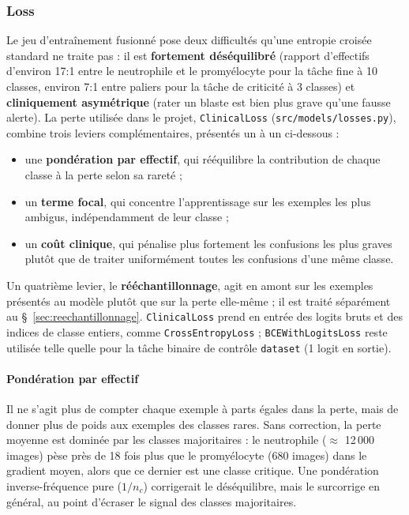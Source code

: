 \subsubsection{Loss}
\label{sec:loss}

Le jeu d’entraînement fusionné pose deux difficultés qu’une entropie croisée standard ne traite pas : il est \textbf{fortement déséquilibré} (rapport d’effectifs d’environ 17:1 entre le neutrophile et le promyélocyte pour la tâche fine à 10 classes, environ 7:1 entre paliers pour la tâche de criticité à 3 classes) et \textbf{cliniquement asymétrique} (rater un blaste est bien plus grave qu’une fausse alerte).
La perte utilisée dans le projet, \texttt{ClinicalLoss} (\texttt{src/models/losses.py}), combine trois leviers complémentaires, présentés un à un ci-dessous :

\begin{itemize}
  \item une \textbf{pondération par effectif}, qui rééquilibre la contribution de chaque classe à la perte selon sa rareté ;
  \item un \textbf{terme focal}, qui concentre l’apprentissage sur les exemples les plus ambigus, indépendamment de leur classe ;
  \item un \textbf{coût clinique}, qui pénalise plus fortement les confusions les plus graves plutôt que de traiter uniformément toutes les confusions d’une même classe.
\end{itemize}

Un quatrième levier, le \textbf{rééchantillonnage}, agit en amont sur les exemples présentés au modèle plutôt que sur la perte elle-même ; il est traité séparément au \S~\ref{sec:reechantillonnage}.
\texttt{ClinicalLoss} prend en entrée des logits bruts et des indices de classe entiers, comme \texttt{CrossEntropyLoss} ; \texttt{BCEWithLogitsLoss} reste utilisée telle quelle pour la tâche binaire de contrôle \texttt{dataset} (1 logit en sortie).

\paragraph{Pondération par effectif}
\label{sec:ponderation-effectif}

Il ne s'agit plus de compter chaque exemple à parts égales dans la perte, mais de donner plus de poids aux exemples des classes rares.
Sans correction, la perte moyenne est dominée par les classes majoritaires : le neutrophile ($\approx$ 12\,000 images) pèse près de 18 fois plus que le promyélocyte (680 images) dans le gradient moyen, alors que ce dernier est une classe critique.
Une pondération inverse-fréquence pure ($1/n_c$) corrigerait le déséquilibre, mais le surcorrige en général, au point d’écraser le signal des classes majoritaires.

